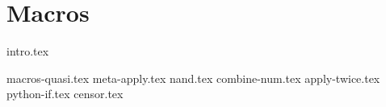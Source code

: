 \documentclass{exam}
\begin{document}
\vspace{5mm}

\section{Macros}
{intro.tex}
\begin{questions}
{macros-quasi.tex}
{meta-apply.tex}
{nand.tex}
{combine-num.tex}
{apply-twice.tex}
{python-if.tex}
{censor.tex}
\end{questions}
\end{document}
